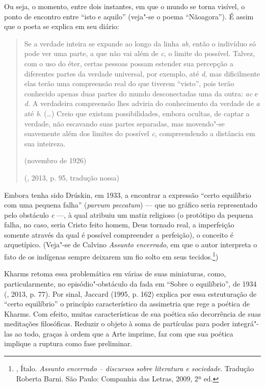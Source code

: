Ou seja, o momento, entre dois instantes, em que o mundo se torna
visível, o ponto de encontro entre ``isto e aquilo'' (veja"-se o poema
``Nãoagora''). É assim que o poeta se explica em seu diário:

\begin{quotation}
Se a verdade inteira se expande ao longo da linha \emph{ab}, então o
indivíduo só pode ver uma parte, a que não vai além de \emph{c}, o
limite do possível. Talvez, com o uso do éter, certas pessoas possam estender sua percepção a
diferentes partes da verdade universal, por exemplo, até \emph{d}, mas
dificilmente elas terão uma compreensão real do que tiverem ``visto'',
pois terão conhecido apenas duas partes do mundo desconectadas uma da
outra: \emph{ac} e \emph{d.} A verdadeira compreensão lhes adviria do
conhecimento da verdade de \emph{a} até \emph{b}. (\ldots{}) Creio que
existam possibilidades, embora ocultas, de captar a verdade, não
escavando suas partes separadas, mas movendo"-se suavemente além dos
limites do possível \emph{c}, compreendendo a distância em sua
inteireza.

\noindent{}(novembro de 1926)

\noindent{}(, 2013, p. 95, tradução nossa)
\end{quotation}

Embora tenha sido Drúskin, em 1933, a encontrar a expressão ``certo
equilíbrio com uma pequena falha'' (\emph{parvum peccatum}) --- que no
gráfico seria representado pelo obstáculo \emph{c} ---, à qual
atribuiu um matiz religioso (o protótipo da pequena falha,
no caso, seria Cristo feito homem, Deus tornado real, a imperfeição
somente através da qual é possível compreender a perfeição), o conceito
é arquetípico. (Veja"-se de Calvino \emph{Assunto
encerrado}, em que o autor interpreta o fato de os indígenas sempre
deixarem um fio solto em seus tecidos.\footnote{, Ítalo. \emph{Assunto encerrado -- discursos sobre literatura e sociedade}. Tradução Roberta Barni. São Paulo: Companhia das Letras, 2009, 2ª ed.})

Kharms retoma essa problemática em várias de suas miniaturas, como, particularmente, no episódio"-obstáculo da fada em ``Sobre o equilíbrio'',
de 1934 (, 2013, p. 77). Por sinal, Jaccard (1995, p. 162)
explica por essa estruturação de ``certo equilíbrio'' o princípio característico da
assimetria que rege a poética de Kharms. Com efeito, muitas
características de sua poética são decorrência de suas meditações filosóficas. Reduzir o objeto à soma de
partículas para poder integrá"-las ao todo, graças à ordem que a Arte
imprime, faz com que sua poética implique a ruptura como fase
preliminar.

